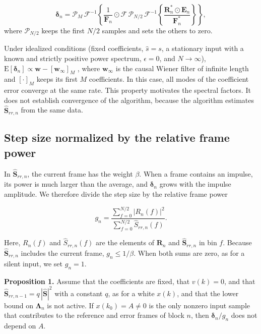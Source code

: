 \documentclass[sip,biber]{now-journal}
\begin{document}
\begin{equation}\label{eq:5}\boldsymbol{\delta}_n = \mathcal{P}_M\, \mathcal{F}^{-1}\!\left\{ \frac{1}{\mathbf{F}_n} \odot \mathcal{F}\, \mathcal{P}_{N/2}\, \mathcal{F}^{-1}\!\left\{ \frac{\mathbf{R}_n^{*} \odot \mathbf{E}_n}{\mathbf{F}_n^{*}} \right\} \right\},\end{equation} where \(\mathcal{P}_{N/2}\) keeps the first \(N/2\) samples and sets the others to zero.

Under idealized conditions (fixed coefficients, \(\hat{s} = s\), a stationary input with a known and strictly positive power spectrum, \(\epsilon = 0\), and \(N \to \infty\)), \(\mathrm{E}[\boldsymbol{\delta}_n] \propto \mathbf{w} - [\mathbf{w}_\infty]_M\) \cite{elliott2000}, where \(\mathbf{w}_\infty\) is the causal Wiener filter of infinite length and \([\cdot]_M\) keeps its first \(M\) coefficients. In this case, all modes of the coefficient error converge at the same rate. This property motivates the spectral factors. It does not establish convergence of the algorithm, because the algorithm estimates \(\hat{\mathbf{S}}_{rr,n}\) from the same data.

\hypertarget{sec:4.3}{%
\subsection{Step size normalized by the relative frame power}\label{sec:4.3}}

In \(\hat{\mathbf{S}}_{rr,n}\), the current frame has the weight \(\beta\). When a frame contains an impulse, its power is much larger than the average, and \(\boldsymbol{\delta}_n\) grows with the impulse amplitude. We therefore divide the step size by the relative frame power

\begin{equation}\label{eq:6}g_n = \frac{\sum_{f=0}^{N/2} |R_n(f)|^2}{\sum_{f=0}^{N/2} \hat{S}_{rr,n}(f)}.\end{equation}

Here, \(R_n(f)\) and \(\hat{S}_{rr,n}(f)\) are the elements of \(\mathbf{R}_n\) and \(\hat{\mathbf{S}}_{rr,n}\) in bin \(f\). Because \(\hat{\mathbf{S}}_{rr,n}\) includes the current frame, \(g_n \le 1/\beta\). When both sums are zero, as for a silent input, we set \(g_n = 1\).

\textbf{Proposition 1.} Assume that the coefficients are fixed, that \(v(k) = 0\), and that \(\hat{\mathbf{S}}_{rr,n-1} = q\,|\hat{\mathbf{S}}|^2\) with a constant \(q\), as for a white \(x(k)\), and that the lower bound on \(\boldsymbol{\Lambda}_n\) is not active. If \(x(k_0) = A \ne 0\) is the only nonzero input sample that contributes to the reference and error frames of block \(n\), then \(\boldsymbol{\delta}_n / g_n\) does not depend on \(A\).
\end{document}
